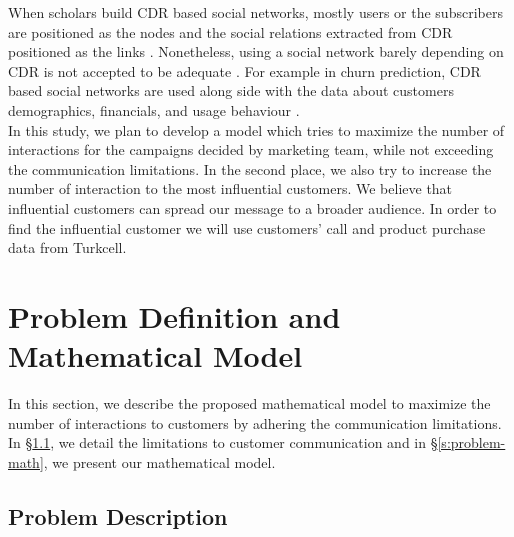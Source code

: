 \documentclass[11pt]{article}
\begin{document}
When scholars build CDR based social networks, mostly users or the subscribers are positioned as the nodes and the social relations extracted from CDR positioned as the links \citep{verbeke, oskarsdottir}. Nonetheless, using a social network barely depending on CDR is not accepted to be adequate \citep{backiel}. For example in churn prediction, CDR based social networks are used along side with the data about customers demographics, financials, and usage behaviour \citep{kusuma, backiel, oskarsdottir}.
\\


In this study, we plan to develop a model which tries to maximize the number of interactions for the campaigns decided by marketing team, while not exceeding the communication limitations. In the second place, we also try to increase the number of interaction to the most influential customers. We believe that influential customers can spread our message to a broader audience. In order to find the influential customer we will use customers' call and product purchase data from Turkcell.

\section{Problem Definition and Mathematical Model}  \label{s:problem-model}

In this section, we describe the proposed mathematical model to maximize the number of interactions to customers by adhering the communication limitations. In \S \ref{s:problem-desc}, we detail the limitations to customer communication and in \S \ref{s:problem-math}, we present our mathematical model.

\subsection{Problem Description} \label{s:problem-desc}
\end{document}
